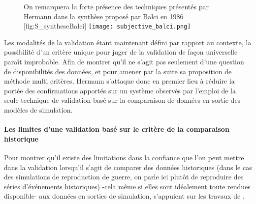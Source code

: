 \begin{figure}[h]
\begin{sidecaption}[fortoc]{ On remarquera la forte présence des techniques présentés par Hermann dans la synthèse proposé par Balci en 1986 \autocite{Balci1986}}[fig:S_syntheseBalci]
  \centering
 \texttt{[image: subjective\_balci.png]}
  \end{sidecaption}
\end{figure}

Les modalités de la validation étant maintenant défini par rapport au contexte, la possibilité d'un critère unique pour juger de la validation de façon universelle paraît improbable. Afin de montrer qu'il ne s'agit pas seulement d'une question de disponibilités des données, et pour amener par la suite sa proposition de méthode multi critères, Hermann s'attaque donc en premier lieu à réduire la portée des confirmations apportés sur un système observés par l'emploi de la seule technique de validation basé sur la comparaison de données en sortie des modèles de simulation.

\paragraph{Les limites d'une validation basé sur le critère de la comparaison historique}

Pour montrer qu'il existe des limitations dans la confiance que l'on peut mettre dans la validation lorsqu'il s'agit de comparer des données historiques (dans le cas des simulations de reproduction de guerre, on parle ici plutôt de reproduire des séries d'événements historiques) -cela même si elles sont idéalement toute rendues disponible- aux données en sorties de simulation, \textcite{Hermann1967b} s'appuient sur les travaux de \textcite{Pool1965}.

